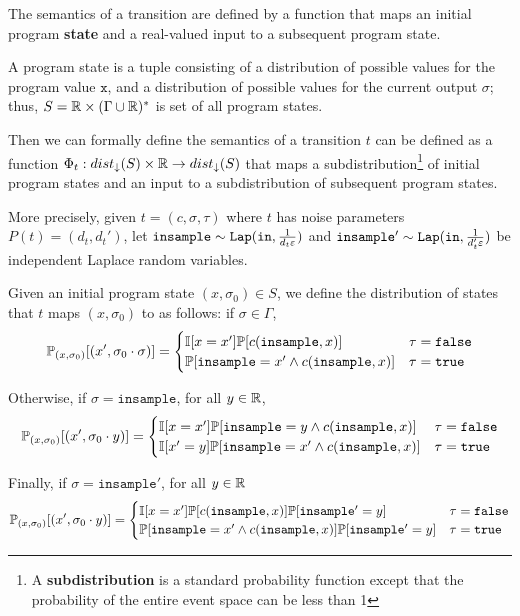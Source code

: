 The semantics of a transition are defined by a function that maps an initial program \textbf{state} and a real-valued input to a subsequent program state. 

A program state is a tuple consisting of a distribution of possible values for the program value $\texttt{x}$, and a distribution of possible values for the current output $\sigma$; thus, $S = \mathbb{R}\times (\Gamma \cup \mathbb{R})^*$ is set of all program states. 

Then we can formally define the semantics of a transition $t$ can be defined as a function $\Phi_t:dist_\downarrow(S)\times \mathbb{R} \to dist_\downarrow (S)$ that maps a subdistribution\footnote{A \textbf{subdistribution} is a standard probability function except that the probability of the entire event space can be less than 1} of initial program states and an input to a subdistribution of subsequent program states. 

More precisely, given $t = (c, \sigma, \tau)$ where $t$ has noise parameters $P(t) = (d_t, d_t')$, let $\texttt{insample}\sim \texttt{Lap}(\texttt{in}, \frac{1}{d_t\varepsilon})$ and $\texttt{insample}'\sim \texttt{Lap}(\texttt{in}, \frac{1}{d_t'\varepsilon})$ be independent Laplace random variables. 

Given an initial program state $(x, \sigma_0)\in S$, we define the distribution of states that $t$ maps $(x, \sigma_0)$ to as follows: if $\sigma \in \Gamma$,
\[\mathbb{P}_{(x, \sigma_0)}[(x', \sigma_0\cdot \sigma)] = \begin{cases}
  \mathbb{I}[x = x']\mathbb{P}[c(\texttt{insample}, x)] & \tau = \texttt{false}\\
  \mathbb{P}[\texttt{insample} = x' \land c(\texttt{insample}, x)] & \tau = \texttt{true}
\end{cases}\]

Otherwise, if $\sigma=\texttt{insample}$, for all $y\in \mathbb{R}$,
\[\mathbb{P}_{(x, \sigma_0)}[(x', \sigma_0\cdot y)] = \begin{cases}
  \mathbb{I}[x = x']\mathbb{P}[\texttt{insample} = y\land c(\texttt{insample}, x)] & \tau = \texttt{false}\\
  \mathbb{I}[x'=y]\mathbb{P}[\texttt{insample} = x' \land c(\texttt{insample}, x)] & \tau = \texttt{true}
\end{cases}\]

Finally, if $\sigma=\texttt{insample}'$, for all $y\in \mathbb{R}$
\[\mathbb{P}_{(x, \sigma_0)}[(x', \sigma_0\cdot y)] = \begin{cases}
  \mathbb{I}[x = x']\mathbb{P}[c(\texttt{insample}, x)]\mathbb{P}[\texttt{insample}' = y] & \tau = \texttt{false}\\
  \mathbb{P}[\texttt{insample} = x' \land c(\texttt{insample}, x)]\mathbb{P}[\texttt{insample}' = y] & \tau = \texttt{true}
\end{cases}\]

